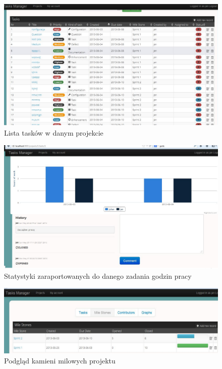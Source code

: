 \documentclass[a4paper,12pt,notitlepage]{mwrep}
\begin{document}
\begin{figure}[H]
\centering
\includegraphics[scale=0.4]{images/app/5.png}
\caption{Lista tasków w danym projekcie}
\label{fig:app_tasks}
\end{figure}

\begin{figure}[H]
\centering
\includegraphics[scale=0.4]{images/app/6.png}
\caption{Statystyki zaraportowanych do danego zadania godzin pracy}
\label{fig:app_hours}
\end{figure}

\begin{figure}[H]
\centering
\includegraphics[scale=0.46]{images/app/7.png}
\caption{Podgląd kamieni milowych projektu}
\label{fig:app_milestones}
\end{figure}
\end{document}
